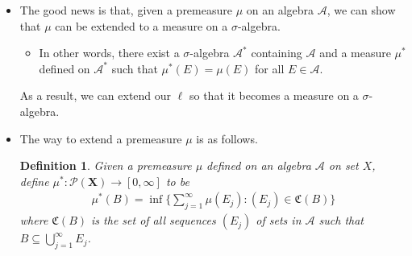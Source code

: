 \documentclass[10pt]{article}
\newtheorem{definition}[lemma]{Definition}
\newcommand{\ve}[1]{\mathbf{#1}}
\newcommand{\mcal}[1]{\mathcal{#1}}
\begin{document}
\begin{itemize}
\begin{proof}
    For the other direction, let $\varepsilon > 0$ be arbitrary. Let $(\varepsilon_j)$ be a sequence of positive numbers with $\sum \epsilon_j < \varepsilon / 2$. Consider the interval $I_j = (a_j - \varepsilon_j, b_k + \varepsilon_j)$. The collection $\{I_j\}$ of open sets is a cover of the interval $[a,b]$. Since $[a,b]$ is compact, it has a finite subcover, say, $I_1$, $I_2$, $\dotsc$, $I_m$. By reordering and discarding some intervals, we may assume that
    \begin{align*}
      a_1 - \varepsilon_1 &< a \\
      b &< b_m + \varepsilon_m \\
      a_j - \varepsilon_j &< b_{j-1} + \varepsilon_{j-1}.
    \end{align*}
    If follows that
    \begin{align*}
      b - a 
      \leq (b_m + \varepsilon_m) - (a_1 - \varepsilon_1) 
      \leq \sum_{j=1}^m [(b_j + \varepsilon_j) - (a_j - \varepsilon_j) ]
      \leq \varepsilon + \sum_{j=1}^m (b_j - a_j) 
      \leq \varepsilon + \sum_{j=1}^\infty (b_j - a_j).
    \end{align*}
    Since $\epsilon > 0$ is arbitrary, it follows that
    \begin{align*}
      \ell((a,b]) \leq \sum_{i=1}^\infty \ell((a_i, b_i]).
    \end{align*}
    As a result, $\ell((a,b]) = \sum_{i=1}^\infty \ell((a_i, b_i])$.

    Combining the results of all cases, we can conclude that $\ell$ is countably additive in $\mcal{F}$.
  \end{proof}

  \item The good news is that, given a premeasure $\mu$ on an algebra $\mcal{A}$, we can show that $\mu$ can be extended to a measure on a $\sigma$-algebra.
  \begin{itemize}
    \item In other words, there exist a $\sigma$-algebra $\mcal{A}^*$ containing $\mcal{A}$ and a measure $\mu^*$ defined on $\mcal{A}^*$ such that $\mu^*(E) = \mu(E)$ for all $E \in \mcal{A}$. 
  \end{itemize}
  As a result, we can extend our $\ell$ so that it becomes a measure on a $\sigma$-algebra.

  \item The way to extend a premeasure $\mu$ is as follows.
  \begin{definition}
    Given a premeasure $\mu$ defined on an algebra $\mcal{A}$ on set $X$, define $\mu^*: \mcal{P}(\ve{X}) \rightarrow [0,\infty]$ to be
    \begin{align*}
      \mu^*(B) = \inf \bigg\{ \sum_{j=1}^\infty \mu(E_j) : (E_j) \in \mathfrak{C}(B) \bigg\}
    \end{align*}
    where $\mathfrak{C}(B)$ is the set of all sequences $(E_j)$ of sets in $\mcal{A}$ such that $B \subseteq \bigcup_{j=1}^\infty E_j$.
  \end{definition}


\end{itemize}
\end{document}
